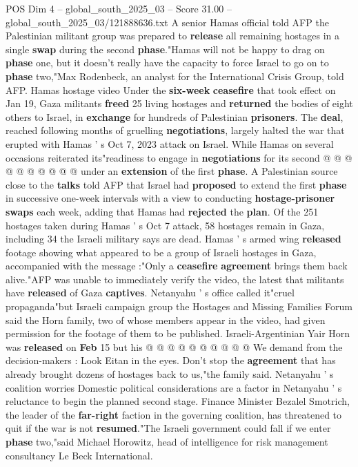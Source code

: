 \begin{textsample}{POS Dim 4 – global\_south\_2025\_03 – Score 31.00 – global\_south\_2025\_03/121888636.txt}
A senior Hamas official told AFP the Palestinian militant group was prepared to \textbf{release} all remaining hostages in a single \textbf{swap} during the second \textbf{phase}."Hamas will not be happy to drag on \textbf{phase} one, but it doesn't really have the capacity to force Israel to go on to \textbf{phase} two,"Max Rodenbeck, an analyst for the International Crisis Group, told AFP.
Hamas hostage video Under the \textbf{six-week} \textbf{ceasefire} that took effect on Jan 19, Gaza militants \textbf{freed} 25 living hostages and \textbf{returned} the bodies of eight others to Israel, in \textbf{exchange} for hundreds of Palestinian \textbf{prisoners}.
The \textbf{deal}, reached following months of gruelling \textbf{negotiations}, largely halted the war that erupted with Hamas ' s Oct 7, 2023 attack on Israel.
While Hamas on several occasions reiterated its"readiness to engage in \textbf{negotiations} for its second @ @ @ @ @ @ @ @ @ @ under an \textbf{extension} of the first \textbf{phase}.
A Palestinian source close to the \textbf{talks} told AFP that Israel had \textbf{proposed} to extend the first \textbf{phase} in successive one-week intervals with a view to conducting \textbf{hostage-prisoner} \textbf{swaps} each week, adding that Hamas had \textbf{rejected} the \textbf{plan}.
Of the 251 hostages taken during Hamas ' s Oct 7 attack, 58 hostages remain in Gaza, including 34 the Israeli military says are dead.
Hamas ' s armed wing \textbf{released} footage showing what appeared to be a group of Israeli hostages in Gaza, accompanied with the message :"Only a \textbf{ceasefire} \textbf{agreement} brings them back alive."AFP was unable to immediately verify the video, the latest that militants have \textbf{released} of Gaza \textbf{captives}.
Netanyahu ' s office called it"cruel propaganda"but Israeli campaign group the Hostages and Missing Families Forum said the Horn family, two of whose members appear in the video, had given permission for the footage of them to be published.
Israeli-Argentinian Yair Horn was \textbf{released} on \textbf{Feb} 15 but his @ @ @ @ @ @ @ @ @ @ We demand from the decision-makers : Look Eitan in the eyes.
Don't stop the \textbf{agreement} that has already brought dozens of hostages back to us,"the family said.
Netanyahu ' s coalition worries Domestic political considerations are a factor in Netanyahu ' s reluctance to begin the planned second stage.
Finance Minister Bezalel Smotrich, the leader of the \textbf{far-right} faction in the governing coalition, has threatened to quit if the war is not \textbf{resumed}."The Israeli government could fall if we enter \textbf{phase} two,"said Michael Horowitz, head of intelligence for risk management consultancy Le Beck International.

\end{textsample}
